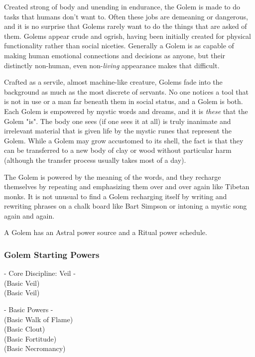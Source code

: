Created strong of body and unending in endurance, the Golem is made to do tasks that humans don't want to. Often these jobs are demeaning or dangerous, and it is no surprise that Golems rarely want to do the things that are asked of them. Golems appear crude and ogrish, having been initially created for physical functionality rather than social niceties. Generally a Golem is as capable of making human emotional connections and decisions as anyone, but their distinctly non-human, even non-\textit{living} appearance makes that difficult. 

Crafted as a servile, almost machine-like creature, Golems fade into the background as much as the most discrete of servants. No one notices a tool that is not in use or a man far beneath them in social status, and a Golem is both. Each Golem is empowered by mystic words and dreams, and it is \textit{these} that the Golem "is". The body one sees (if one sees it at all) is truly inanimate and irrelevant material that is given life by the mystic runes that represent the Golem. While a Golem may grow accustomed to its shell, the fact is that they can be transferred to a new body of clay or wood without particular harm (although the transfer process usually takes most of a day).

The Golem is powered by the meaning of the words, and they recharge themselves by repeating and emphasizing them over and over again like Tibetan monks. It is not unusual to find a Golem recharging itself by writing and rewriting phrases on a chalk board like Bart Simpson or intoning a mystic song again and again.

A Golem has an Astral power source and a Ritual power schedule.

\subsubsection{Golem Starting Powers}

\hspace{\parindent} - Core Discipline: Veil -\\
 (Basic Veil)\\
 (Basic Veil)

- Basic Powers -\\
 (Basic Walk of Flame)\\
 (Basic Clout)\\
 (Basic Fortitude)\\
 (Basic Necromancy)

